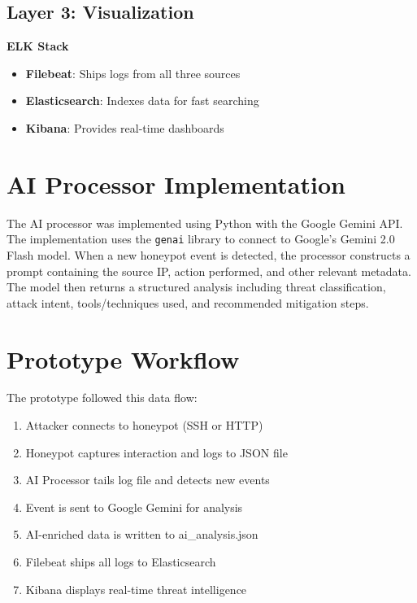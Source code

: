 \documentclass[12pt,a4paper]{report}
\begin{document}
\subsection*{Layer 3: Visualization}

\textbf{ELK Stack}
\begin{itemize}
\item \textbf{Filebeat}: Ships logs from all three sources
\item \textbf{Elasticsearch}: Indexes data for fast searching
\item \textbf{Kibana}: Provides real-time dashboards
\end{itemize}

\section{AI Processor Implementation}

The AI processor was implemented using Python with the Google Gemini API. The implementation uses the \texttt{genai} library to connect to Google's Gemini 2.0 Flash model. When a new honeypot event is detected, the processor constructs a prompt containing the source IP, action performed, and other relevant metadata. The model then returns a structured analysis including threat classification, attack intent, tools/techniques used, and recommended mitigation steps.

\section{Prototype Workflow}

The prototype followed this data flow:

\begin{enumerate}
\item Attacker connects to honeypot (SSH or HTTP)
\item Honeypot captures interaction and logs to JSON file
\item AI Processor tails log file and detects new events
\item Event is sent to Google Gemini for analysis
\item AI-enriched data is written to ai\_analysis.json
\item Filebeat ships all logs to Elasticsearch
\item Kibana displays real-time threat intelligence
\end{enumerate}


\end{document}
